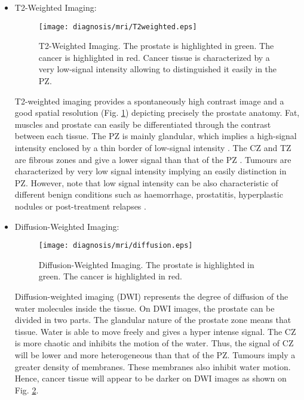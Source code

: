 \begin{itemize}

	\item T2-Weighted Imaging:	
	\begin{figure}
	\centering
	\texttt{[image: diagnosis/mri/T2weighted.eps]}
	\caption{T2-Weighted Imaging. The prostate is highlighted in green. The cancer is highlighted in red. Cancer tissue is characterized by a very low-signal intensity allowing to distinguished it easily in the PZ.}
	\label{fig:intro:prostatecancer:diagnosis:mri:t2weighted}
	\end{figure}
T2-weighted imaging provides a spontaneously high contrast image and a good spatial resolution (Fig. \ref{fig:intro:prostatecancer:diagnosis:mri:t2weighted}) depicting precisely the prostate anatomy. Fat, muscles and prostate can easily be differentiated through the contrast between each tissue. The PZ is mainly glandular, which implies a high-signal intensity enclosed by a thin border of low-signal intensity \cite{Carroll2006}. The CZ and TZ are fibrous zones and give a lower signal than that of the PZ \cite{Carroll2006}. Tumours are characterized by very low signal intensity \cite{Carroll2006} implying an easily distinction in PZ. However, note that low signal intensity can be also characteristic of different benign conditions such as haemorrhage, prostatitis, hyperplastic nodules or post-treatment relapses \cite{Claus2004}.

	\item Diffusion-Weighted Imaging:
	\begin{figure}
	\centering
	\texttt{[image: diagnosis/mri/diffusion.eps]}
	\caption{Diffusion-Weighted Imaging. The prostate is highlighted in green. The cancer is highlighted in red.}
	\label{fig:intro:prostatecancer:diagnosis:mri:diffusion}
	\end{figure}
Diffusion-weighted imaging (DWI\g) represents the degree of diffusion of the water molecules inside the tissue. On DWI images, the prostate can be divided in two parts. The glandular nature of the prostate zone means that tissue. Water is able to move freely and gives a hyper intense signal. The CZ is more chaotic and inhibits the motion of the water. Thus, the signal of CZ will be lower and more heterogeneous than that of the PZ. Tumours imply a greater density of membranes. These membranes also inhibit water motion. Hence, cancer tissue will appear to be darker on DWI images as shown on Fig. \ref{fig:intro:prostatecancer:diagnosis:mri:diffusion}.


\end{itemize}
